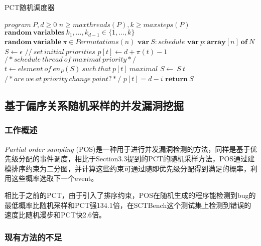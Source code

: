 \begin{algorithm}[!ht]
\caption{PCT随机调度器}
\label{pct_arch}
\begin{algorithmic}[1]
    \REQUIRE $program \ P,d \ge 0$
    \REQUIRE $n\ge maxthreads(P), k\ge maxsteps(P)$
    \REQUIRE $\mathbf{random\ variables}\ k_{1},…,k_{d-1}\in \{1,…,k\}$
    \REQUIRE $\mathbf{random\ variable}\ \pi\in Permutations(n)$
    \STATE $\mathbf{var}\ S:schedule$
    \STATE $\mathbf{var}\ p:\mathbf{array}[n]\ \mathbf{of}\ N$
    \STATE $S\leftarrow\epsilon $
    \STATE $//\ set\ initial\ priorities$
        \STATE $p[t]\leftarrow d+\pi (t)-1$
    \ENDFOR
        \STATE $/*schedule \ thread \ of \ maximal \ priority*/$
        \STATE $t\leftarrow element \ of \ en_{P}(S) \ such\ that \ p[t] \ maximal$
        \STATE $S\leftarrow \ S \ t$
        \STATE $/*are \ we \ at \ priority \ change \ point?*/$
                \STATE $p[t]=d-i$
            \ENDIF
        \ENDFOR
    \ENDWHILE
    \STATE $\mathbf{return} \ S$
\end{algorithmic}  
\end{algorithm}

\subsection{基于偏序关系随机采样的并发漏洞挖掘}

\subsubsection{工作概述}

\textit{Partial order sampling} (POS)是一种用于进行并发漏洞检测的方法，同样是基于优先级分配的事件调度，相比于Section3.3提到的PCT的随机采样方法，POS通过建模排序约束为二分图，并计算这些约束可通过随即优先级分配得到满足的概率，利用这些概率选取下一个event。

相比于之前的PCT，由于引入了排序约束，POS在随机生成的程序能检测到bug的最低概率比随机采样和PCT强134.1倍，在SCTBench这个测试集上检测到错误的速度比随机漫步和PCT快2.6倍。

\subsubsection{现有方法的不足}

